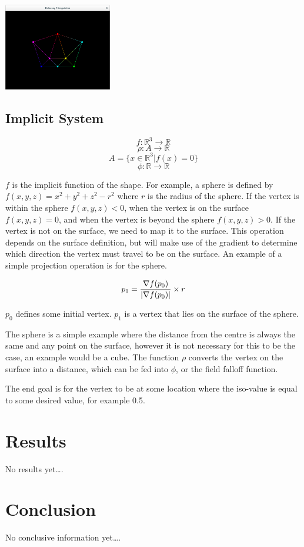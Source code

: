 \documentclass[conference]{acmsiggraph}
\begin{document}
\includegraphics[height=1.5in]{images/Triangulated.png}


\subsection{Implicit System}

$$f : \mathbb{R}^3 \rightarrow \mathbb{R}$$
$$\rho : A \rightarrow \mathbb{R} $$
$$A = \{x \in \mathbb{R}^3 | f(x) = 0\}$$
$$\phi : \mathbb{R} \rightarrow \mathbb{R}$$

$f$ is the implicit function of the shape. For example, a sphere is defined by
$f(x, y, z) = x^2 + y ^ 2 + z ^ 2 - r^2$ where $r$ is the radius of the sphere.
If the vertex is within the sphere $f(x, y, z) < 0$, when the vertex is on the
surface $f(x, y, z) = 0$, and when the vertex is beyond the sphere $f(x, y, z)
> 0$. If the vertex is not on the surface, we need to map it to the surface.
This operation depends on the surface definition, but will make use of the
gradient to determine which direction the vertex must travel to be on the
surface. An example of a simple projection operation is for the sphere.

$$p_1 = {\nabla f(p_0) \over |\nabla f(p_0)|} \times r$$

$p_0$ defines some initial vertex. $p_1$ is a vertex that lies on the surface
of the sphere.

The sphere is a simple example where the distance from the centre is always the
same and any point on the surface, however it is not necessary for this to be
the case, an example would be a cube. The function $\rho$ converts the vertex
on the surface into a distance, which can be fed into $\phi$, or the field
falloff function.

The end goal is for the vertex to be at some location where the iso-value is
equal to some desired value, for example 0.5.


\section{Results}
No results yet\ldots.


\section{Conclusion}
No conclusive information yet\ldots.




\end{document}
